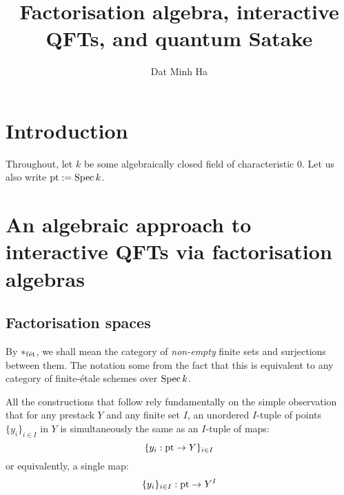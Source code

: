 

\setcounter{section}{-1}





    \title{Factorisation algebra, interactive QFTs, and quantum Satake}
    
    \author{Dat Minh Ha}
    \maketitle
    
    \begin{abstract}
        
    \end{abstract}
    
    {
      \hypersetup{} 
      \tableofcontents %
    }

    \section{Introduction}
        \begin{convention}
            Throughout, let $k$ be some algebraically closed field of characteristic $0$. Let us also write $\mathrm{pt} := \operatorname{Spec} k$.
        \end{convention}

    \section{An algebraic approach to interactive QFTs via factorisation algebras}
        \subsection{Factorisation spaces}
            \begin{convention}
                By $*_{\mathrm{f\acute{e}t}}$, we shall mean the category of \textit{non-empty} finite sets and surjections between them. The notation some from the fact that this is equivalent to any category of finite-\'etale schemes over $\operatorname{Spec} k$.
            \end{convention}

            \begin{remark}
                All the constructions that follow rely fundamentally on the simple observation that for any prestack $Y$ and any finite set $I$, an unordered $I$-tuple of points $\{y_i\}_{i \in I}$ in $Y$ is simultaneously the same as an $I$-tuple of maps:
                    $$\{y_i: \mathrm{pt} \to Y\}_{i \in I}$$
                or equivalently, a single map:
                    $$\{y_i\}_{i \in I}: \mathrm{pt} \to Y^I$$
            \end{remark}

